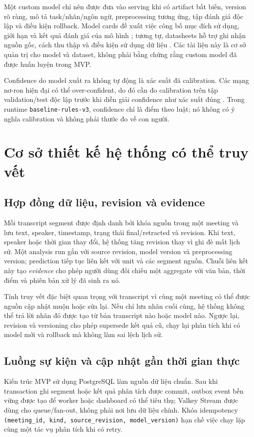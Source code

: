 Một custom model chỉ nên được đưa vào serving khi có artifact bất biến, version rõ ràng, mô tả task/nhãn/ngôn ngữ, preprocessing tương ứng, tập đánh giá độc lập và điều kiện rollback. Model cards đề xuất việc công bố mục đích sử dụng, giới hạn và kết quả đánh giá của mô hình \cite{mitchell2019}; tương tự, datasheets hỗ trợ ghi nhận nguồn gốc, cách thu thập và điều kiện sử dụng dữ liệu \cite{gebru2021}. Các tài liệu này là cơ sở quản trị cho model và dataset, không phải bằng chứng rằng custom model đã được huấn luyện trong MVP.

Confidence do model xuất ra không tự động là xác suất đã calibration. Các mạng nơ-ron hiện đại có thể over-confident, do đó cần đo calibration trên tập validation/test độc lập trước khi diễn giải confidence như xác suất đúng \cite{guo2017}. Trong runtime \texttt{baseline-rules-v3}, confidence chỉ là điểm theo luật; nó không có ý nghĩa calibration và không phải thước đo về con người.

\section{Cơ sở thiết kế hệ thống có thể truy vết}
\subsection{Hợp đồng dữ liệu, revision và evidence}
Mỗi transcript segment được định danh bởi khóa nguồn trong một meeting và lưu text, speaker, timestamp, trạng thái final/retracted và revision. Khi text, speaker hoặc thời gian thay đổi, hệ thống tăng revision thay vì ghi đè mất lịch sử. Một analysis run gắn với source revision, model version và preprocessing version; prediction tiếp tục liên kết với unit và các segment nguồn. Chuỗi liên kết này tạo \emph{evidence} cho phép người dùng đối chiếu một aggregate với văn bản, thời điểm và phiên bản xử lý đã sinh ra nó.

Tính truy vết đặc biệt quan trọng với transcript vì cùng một meeting có thể được nguồn cập nhật muộn hoặc sửa lại. Nếu chỉ lưu nhãn cuối cùng, hệ thống không thể trả lời nhãn đó được tạo từ bản transcript nào hoặc model nào. Ngược lại, revision và versioning cho phép supersede kết quả cũ, chạy lại phân tích khi có model mới và rollback mà không làm sai lệch lịch sử.

\subsection{Luồng sự kiện và cập nhật gần thời gian thực}
Kiến trúc MVP sử dụng PostgreSQL làm nguồn dữ liệu chuẩn. Sau khi transaction ghi segment hoặc kết quả phân tích được commit, outbox event bền vững được tạo để worker hoặc dashboard có thể tiêu thụ; Valkey Stream được dùng cho queue/fan-out, không phải nơi lưu dữ liệu chính. Khóa idempotency \texttt{(meeting\_id, kind, source\_revision, model\_version)} hạn chế việc chạy lặp cùng một tác vụ phân tích khi có retry.

